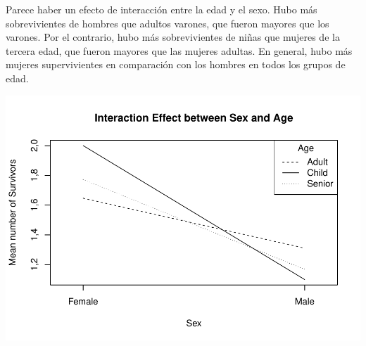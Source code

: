 \documentclass[]{article}
\newenvironment{Shaded}{\begin{snugshade}}{\end{snugshade}}
\newcommand{\KeywordTok}[1]{\textcolor[rgb]{0.13,0.29,0.53}{\textbf{#1}}}
\newcommand{\DataTypeTok}[1]{\textcolor[rgb]{0.13,0.29,0.53}{#1}}
\newcommand{\DecValTok}[1]{\textcolor[rgb]{0.00,0.00,0.81}{#1}}
\newcommand{\StringTok}[1]{\textcolor[rgb]{0.31,0.60,0.02}{#1}}
\newcommand{\OtherTok}[1]{\textcolor[rgb]{0.56,0.35,0.01}{#1}}
\newcommand{\OperatorTok}[1]{\textcolor[rgb]{0.81,0.36,0.00}{\textbf{#1}}}
\newcommand{\NormalTok}[1]{#1}
\begin{document}
Parece haber un efecto de interacción entre la edad y el sexo. Hubo más
sobrevivientes de hombres que adultos varones, que fueron mayores que
los varones. Por el contrario, hubo más sobrevivientes de niñas que
mujeres de la tercera edad, que fueron mayores que las mujeres adultas.
En general, hubo más mujeres supervivientes en comparación con los
hombres en todos los grupos de edad.

\begin{Shaded}
\end{Shaded}

\includegraphics{titanicDataClean_files/figure-latex/unnamed-chunk-20-1.pdf}
\end{document}
